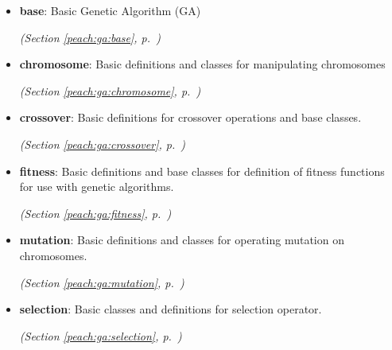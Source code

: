 \begin{itemize}
\setlength{\parskip}{0ex}
\item \textbf{base}: 
Basic Genetic Algorithm (GA)


  \textit{(Section \ref{peach:ga:base}, p.~\pageref{peach:ga:base})}

\item \textbf{chromosome}: 
Basic definitions and classes for manipulating chromosomes


  \textit{(Section \ref{peach:ga:chromosome}, p.~\pageref{peach:ga:chromosome})}

\item \textbf{crossover}: 
Basic definitions for crossover operations and base classes.


  \textit{(Section \ref{peach:ga:crossover}, p.~\pageref{peach:ga:crossover})}

\item \textbf{fitness}: 
Basic definitions and base classes for definition of fitness functions for use
with genetic algorithms.


  \textit{(Section \ref{peach:ga:fitness}, p.~\pageref{peach:ga:fitness})}

\item \textbf{mutation}: 
Basic definitions and classes for operating mutation on chromosomes.


  \textit{(Section \ref{peach:ga:mutation}, p.~\pageref{peach:ga:mutation})}

\item \textbf{selection}: 
Basic classes and definitions for selection operator.


  \textit{(Section \ref{peach:ga:selection}, p.~\pageref{peach:ga:selection})}

\end{itemize}


